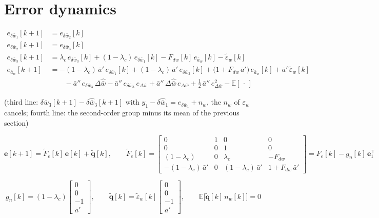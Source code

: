 \documentclass[11pt,a4paper,fontset=none]{ctexart}
\newcommand{\ba}{\bar{a}}
\newcommand{\bw}{\bar{w}}
\newcommand{\E}{\mathbb{E}}
\newcommand{\dWh}{\Delta\hat{\bw}}
\newcommand{\eD}{e_{\Delta\bw}}
\newcommand{\ap}{\ba'}
\newcommand{\app}{\ba''}
\newcommand{\et}{\tilde{\varepsilon}_w}
\begin{document}
\section{Error dynamics}

\begin{align*}
e_{\delta\bw_1}[k+1] &= e_{\delta\bw_2}[k] \\
e_{\delta\bw_2}[k+1] &= e_{\delta\bw_3}[k] \\
e_{\delta\bw_3}[k+1] &= \lambda_c\,e_{\delta\bw_3}[k] + (1-\lambda_c)\,e_{\delta\bw_1}[k] - F_{dw}[k]\,e_{\ba_w}[k] - \et[k] \\
e_{\ba_w}[k+1]       &= -(1-\lambda_c)\,\ap\,e_{\delta\bw_1}[k]
                      + (1-\lambda_c)\,\ap\,e_{\delta\bw_3}[k]
                      + \bigl(1 + F_{dw}\,\ap\bigr)\,e_{\ba_w}[k]
                      + \ap\,\et[k] \\
                     &\qquad - \app\,e_{\delta\bw_3}\,\dWh - \app\,e_{\delta\bw_3}\,\eD + \app\,\dWh\,\eD + \tfrac{1}{2}\,\app\,\eD^{2}
                      - \E[\,\cdot\,]
\end{align*}

(third line: $\delta\bw_3[k+1] - \delta\hat{\bw}_3[k+1]$ with $y_1 - \delta\hat{\bw}_1 = e_{\delta\bw_1} + n_w$, the $n_w$ of $\varepsilon_w$ cancels;
fourth line: the second-order group minus its mean of the previous section)

\begin{equation*}
\mathbf{e}[k+1] = \tilde{F}_e[k]\,\mathbf{e}[k] + \tilde{\mathbf{q}}[k], \qquad
\tilde{F}_e[k] =
\begin{bmatrix}
0 & 1 & 0 & 0 \\
0 & 0 & 1 & 0 \\
(1-\lambda_c) & 0 & \lambda_c & -F_{dw} \\
-(1-\lambda_c)\,\ap & 0 & (1-\lambda_c)\,\ap & 1 + F_{dw}\,\ap
\end{bmatrix}
= F_e[k] - g_n[k]\,\mathbf{e}_1^{\top}
\end{equation*}

\begin{equation*}
g_n[k] = (1-\lambda_c)\begin{bmatrix} 0 \\ 0 \\ -1 \\ \ap \end{bmatrix} , \qquad
\tilde{\mathbf{q}}[k] = \et[k]\begin{bmatrix} 0 \\ 0 \\ -1 \\ \ap \end{bmatrix} , \qquad
\E\bigl[\tilde{\mathbf{q}}[k]\,n_w[k]\bigr] = 0
\end{equation*}
\end{document}

